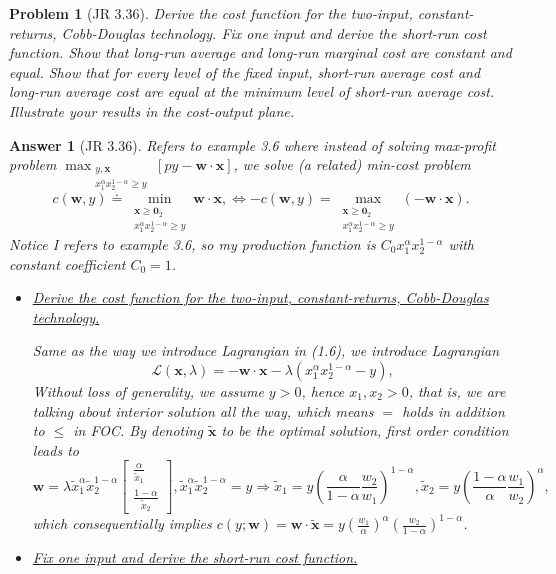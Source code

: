 \documentclass{article}
\newtheorem*{ans}{Answer}
\newtheorem*{prob}{{\bf Problem}}
\newcommand{\1}{{\bf 1}}
\newcommand{\cL}{\mathcal{L}}
\newcommand{\0}{{\mathbf{0}}}
\newcommand{\w}{{\mathbf{w}}}
\newcommand{\x}{{\mathbf{x}}}
\newcommand{\<}{\langle}
\renewcommand{\>}{\rangle}
\newcommand{\dps}{\displaystyle}
\begin{document}
\begin{prob}[JR 3.36] Derive the cost function for the two-input, constant-returns, Cobb-Douglas technology. Fix one input and derive the short-run cost function. Show that long-run average and long-run marginal cost are constant and equal. Show that for every level of the fixed input, short-run average cost and long-run average cost are equal at the minimum level of short-run average cost. Illustrate your results in the cost-output plane.
\end{prob}
\begin{ans}[JR 3.36] Refers to example 3.6 where instead of solving max-profit problem
$\dps
	\max_{\substack{y,\x \\ x_1^{\alpha}x_2^{1- \alpha} \ge y }}\left[py - \w\cdot \x\right]
$, we solve (a related) min-cost problem
$$ c(\w , y) \doteq	\min_{\substack{\x\ge \0_2 \\ x_1^{\alpha}x_2^{1- \alpha} \ge y}}   \w\cdot \x ,   \Leftrightarrow -c(\w, y) = \max_{\substack{\x\ge \0_2 \\ x_1^{\alpha}x_2^{1- \alpha} \ge y}}  (-\w\cdot \x)  .
$$
	Notice I refers to example 3.6, so my production function is $C_0x_1^{\alpha} x_2^{1 - \alpha} $ with constant coefficient $C_0=1$.
\begin{itemize}
	\item \ul{Derive the cost function for the two-input, constant-returns, Cobb-Douglas technology.}
	

	
	Same as the way we introduce Lagrangian in (1.6), we introduce Lagrangian
	$$
	\cL (\x,\lambda) = - \w\cdot \x - \lambda \left( x_1^{\alpha} x_2^{1 - \alpha} - y\right),
	$$
Without loss of generality, we assume $y>0$, hence $x_1,x_2 >0$, that is, we are talking about interior solution all the way, which means $=$ holds in addition to $\le $ in FOC. By denoting $\tilde \x$ to be the optimal solution, first order condition leads to 
	$$
	\w = \lambda \tilde x_1^{\alpha}\tilde x_2^{1- \alpha} \begin{bmatrix}
	\frac{\alpha}{\tilde  x_1} \\ 	\frac{ 1 - \alpha}{\tilde  x_2} 
	\end{bmatrix},\tilde  x_1^{\alpha} \tilde x_2^{1 - \alpha} = y \Rightarrow \tilde x_1 = y \left( \frac{\alpha}{1 - \alpha}\frac{w_2}{w_1} \right)^{ 1 - \alpha}, \tilde x_2 = y \left( \frac{1 - \alpha}{\alpha}\frac{w_1}{w_2} \right)^\alpha,
	$$
	which consequentially implies $c(y; \w ) =\w \cdot \tilde \x = y \left(\frac{w_1}{\alpha}\right)^\alpha \left(\frac{w_2}{1 - \alpha }\right)^{1 - \alpha}$.
	\item \ul{Fix one input and derive the short-run cost function. } 
	

\end{itemize}
\end{ans}
\end{document}
